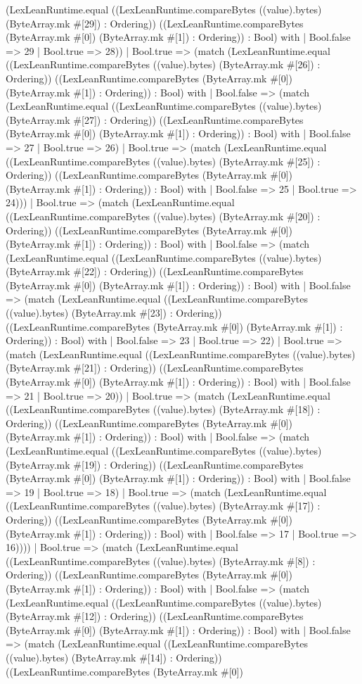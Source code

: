 \documentclass[11pt]{article}
\begin{document}
(LexLeanRuntime.equal ((LexLeanRuntime.compareBytes ((value).bytes) (ByteArray.mk \#[29]) : Ordering)) ((LexLeanRuntime.compareBytes (ByteArray.mk \#[0]) (ByteArray.mk \#[1]) : Ordering)) : Bool) with | Bool.false => 29 | Bool.true => 28)) | Bool.true => (match (LexLeanRuntime.equal ((LexLeanRuntime.compareBytes ((value).bytes) (ByteArray.mk \#[26]) : Ordering)) ((LexLeanRuntime.compareBytes (ByteArray.mk \#[0]) (ByteArray.mk \#[1]) : Ordering)) : Bool) with | Bool.false => (match (LexLeanRuntime.equal ((LexLeanRuntime.compareBytes ((value).bytes) (ByteArray.mk \#[27]) : Ordering)) ((LexLeanRuntime.compareBytes (ByteArray.mk \#[0]) (ByteArray.mk \#[1]) : Ordering)) : Bool) with | Bool.false => 27 | Bool.true => 26) | Bool.true => (match (LexLeanRuntime.equal ((LexLeanRuntime.compareBytes ((value).bytes) (ByteArray.mk \#[25]) : Ordering)) ((LexLeanRuntime.compareBytes (ByteArray.mk \#[0]) (ByteArray.mk \#[1]) : Ordering)) : Bool) with | Bool.false => 25 | Bool.true => 24))) | Bool.true => (match (LexLeanRuntime.equal ((LexLeanRuntime.compareBytes ((value).bytes) (ByteArray.mk \#[20]) : Ordering)) ((LexLeanRuntime.compareBytes (ByteArray.mk \#[0]) (ByteArray.mk \#[1]) : Ordering)) : Bool) with | Bool.false => (match (LexLeanRuntime.equal ((LexLeanRuntime.compareBytes ((value).bytes) (ByteArray.mk \#[22]) : Ordering)) ((LexLeanRuntime.compareBytes (ByteArray.mk \#[0]) (ByteArray.mk \#[1]) : Ordering)) : Bool) with | Bool.false => (match (LexLeanRuntime.equal ((LexLeanRuntime.compareBytes ((value).bytes) (ByteArray.mk \#[23]) : Ordering)) ((LexLeanRuntime.compareBytes (ByteArray.mk \#[0]) (ByteArray.mk \#[1]) : Ordering)) : Bool) with | Bool.false => 23 | Bool.true => 22) | Bool.true => (match (LexLeanRuntime.equal ((LexLeanRuntime.compareBytes ((value).bytes) (ByteArray.mk \#[21]) : Ordering)) ((LexLeanRuntime.compareBytes (ByteArray.mk \#[0]) (ByteArray.mk \#[1]) : Ordering)) : Bool) with | Bool.false => 21 | Bool.true => 20)) | Bool.true => (match (LexLeanRuntime.equal ((LexLeanRuntime.compareBytes ((value).bytes) (ByteArray.mk \#[18]) : Ordering)) ((LexLeanRuntime.compareBytes (ByteArray.mk \#[0]) (ByteArray.mk \#[1]) : Ordering)) : Bool) with | Bool.false => (match (LexLeanRuntime.equal ((LexLeanRuntime.compareBytes ((value).bytes) (ByteArray.mk \#[19]) : Ordering)) ((LexLeanRuntime.compareBytes (ByteArray.mk \#[0]) (ByteArray.mk \#[1]) : Ordering)) : Bool) with | Bool.false => 19 | Bool.true => 18) | Bool.true => (match (LexLeanRuntime.equal ((LexLeanRuntime.compareBytes ((value).bytes) (ByteArray.mk \#[17]) : Ordering)) ((LexLeanRuntime.compareBytes (ByteArray.mk \#[0]) (ByteArray.mk \#[1]) : Ordering)) : Bool) with | Bool.false => 17 | Bool.true => 16)))) | Bool.true => (match (LexLeanRuntime.equal ((LexLeanRuntime.compareBytes ((value).bytes) (ByteArray.mk \#[8]) : Ordering)) ((LexLeanRuntime.compareBytes (ByteArray.mk \#[0]) (ByteArray.mk \#[1]) : Ordering)) : Bool) with | Bool.false => (match (LexLeanRuntime.equal ((LexLeanRuntime.compareBytes ((value).bytes) (ByteArray.mk \#[12]) : Ordering)) ((LexLeanRuntime.compareBytes (ByteArray.mk \#[0]) (ByteArray.mk \#[1]) : Ordering)) : Bool) with | Bool.false => (match (LexLeanRuntime.equal ((LexLeanRuntime.compareBytes ((value).bytes) (ByteArray.mk \#[14]) : Ordering)) ((LexLeanRuntime.compareBytes (ByteArray.mk \#[0]) 
\end{document}
